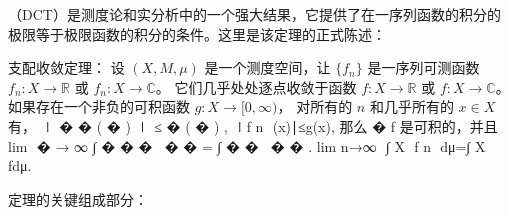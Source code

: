 
\begin{issues}
\issueDraft
\end{issues}


（DCT）是测度论和实分析中的一个强大结果，它提供了在一序列函数的积分的极限等于极限函数的积分的条件。这里是该定理的正式陈述：

支配收敛定理：
设 $(X,M,\mu)$ 是一个测度空间，让 $\{f_n\}$ 是一序列可测函数 $f_n: X\to\mathbb R$ 或 $f_n:X\to\mathbb C$。 它们几乎处处逐点收敛于函数 $f: X\to\mathbb R$ 或 $f:X\to\mathbb C$。 如果存在一个非负的可积函数 $g:X\to[0,\infty)$， 对所有的 $n$ 和几乎所有的 $x\in X$ 有，
∣
�
�
(
�
)
∣
≤
�
(
�
)
,
∣f 
n
​
 (x)∣≤g(x),
那么 
�
f 是可积的，并且
lim
⁡
�
→
∞
∫
�
�
�
 
�
�
=
∫
�
�
 
�
�
.
lim 
n→∞
​
 ∫ 
X
​
 f 
n
​
 dμ=∫ 
X
​
 fdμ.

定理的关键组成部分：
